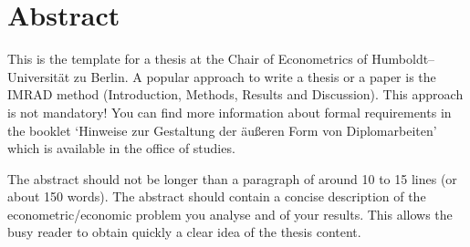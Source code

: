 \section*{Abstract}

This is the template for a thesis at the Chair of Econometrics of
Humboldt--Universit\"at zu Berlin. A popular approach to write a
thesis or a paper is the IMRAD method (Introduction, Methods,
Results and Discussion). This approach is not mandatory! You can
find more information about formal requirements in the booklet
`Hinweise zur Gestaltung der \"au\ss eren Form von Diplomarbeiten' which is available in the office of studies.

The abstract should not be longer than a paragraph of around 10 to 15 lines (or about 150 words). The abstract should contain a
concise description of the econometric/economic problem you
analyse and of your results. This allows the busy reader to obtain quickly a clear idea of the thesis content.
